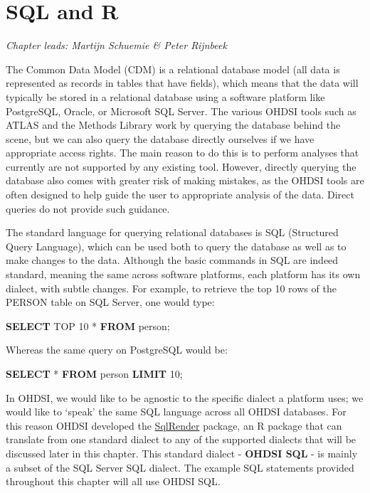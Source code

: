 \documentclass[11pt]{book}
\newenvironment{Shaded}{\begin{snugshade}}{\end{snugshade}}
\newcommand{\KeywordTok}[1]{\textcolor[rgb]{0.13,0.29,0.53}{\textbf{#1}}}
\newcommand{\DecValTok}[1]{\textcolor[rgb]{0.00,0.00,0.81}{#1}}
\newcommand{\NormalTok}[1]{#1}
\theoremstyle{definition}
\theoremstyle{definition}
\theoremstyle{definition}
\theoremstyle{remark}
\begin{document}
\chapter{SQL and R}\label{SqlAndR}

\emph{Chapter leads: Martijn Schuemie \& Peter Rijnbeek}

The Common Data Model (CDM) is a relational database model (all data is
represented as records in tables that have fields), which means that the
data will typically be stored in a relational database using a software
platform like PostgreSQL, Oracle, or Microsoft SQL Server. The various
OHDSI tools such as ATLAS and the Methods Library work by querying the
database behind the scene, but we can also query the database directly
ourselves if we have appropriate access rights. The main reason to do
this is to perform analyses that currently are not supported by any
existing tool. However, directly querying the database also comes with
greater risk of making mistakes, as the OHDSI tools are often designed
to help guide the user to appropriate analysis of the data. Direct
queries do not provide such guidance.

The standard language for querying relational databases is SQL
(Structured Query Language), which can be used both to query the
database as well as to make changes to the data. Although the basic
commands in SQL are indeed standard, meaning the same across software
platforms, each platform has its own dialect, with subtle changes. For
example, to retrieve the top 10 rows of the PERSON table on SQL Server,
one would type:  

\begin{Shaded}
\begin{Highlighting}[]
\KeywordTok{SELECT}\NormalTok{ TOP }\DecValTok{10}\NormalTok{ * }\KeywordTok{FROM}\NormalTok{ person;}
\end{Highlighting}
\end{Shaded}

Whereas the same query on PostgreSQL would be:

\begin{Shaded}
\begin{Highlighting}[]
\KeywordTok{SELECT}\NormalTok{ * }\KeywordTok{FROM}\NormalTok{ person }\KeywordTok{LIMIT} \DecValTok{10}\NormalTok{;}
\end{Highlighting}
\end{Shaded}

In OHDSI, we would like to be agnostic to the specific dialect a
platform uses; we would like to `speak' the same SQL language across all
OHDSI databases. For this reason OHDSI developed the
\href{https://ohdsi.github.io/SqlRender/}{SqlRender} package, an R
package that can translate from one standard dialect to any of the
supported dialects that will be discussed later in this chapter. This
standard dialect - \textbf{OHDSI SQL} - is mainly a subset of the SQL
Server SQL dialect. The example SQL statements provided throughout this
chapter will all use OHDSI SQL. 
\end{document}
